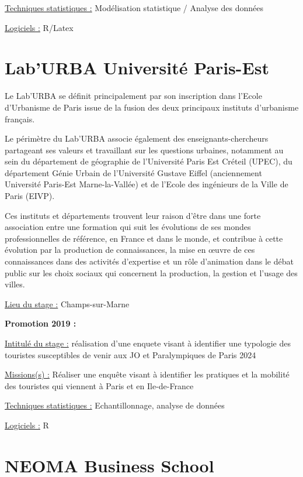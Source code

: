 \documentclass[
  letterpaper,
  DIV=11,
  numbers=noendperiod]{scrreprt}
\begin{document}
\uline{Techniques statistiques :} Modélisation statistique / Analyse des
données

\uline{Logiciels :} R/Latex

\hypertarget{laburba-universituxe9-paris-est}{%
\section{\texorpdfstring{\textbf{Lab'URBA Université
Paris-Est}}{Lab'URBA Université Paris-Est}}\label{laburba-universituxe9-paris-est}}

Le Lab'URBA se définit principalement par son inscription dans l'Ecole
d'Urbanisme de Paris issue de la fusion des deux principaux instituts
d'urbanisme français.

Le périmètre du Lab'URBA associe également des enseignants-chercheurs
partageant ses valeurs et travaillant sur les questions urbaines,
notamment au sein du département de géographie de l'Université Paris Est
Créteil (UPEC), du département Génie Urbain de l'Université Gustave
Eiffel (anciennement Université Paris-Est Marne-la-Vallée) et de l'Ecole
des ingénieurs de la Ville de Paris (EIVP).

Ces instituts et départements trouvent leur raison d'être dans une forte
association entre une formation qui suit les évolutions de ses mondes
professionnelles de référence, en France et dans le monde, et contribue
à cette évolution par la production de connaissances, la mise en œuvre
de ces connaissances dans des activités d'expertise et un rôle
d'animation dans le débat public sur les choix sociaux qui concernent la
production, la gestion et l'usage des villes.

\uline{Lieu du stage :} Champs-sur-Marne

\textbf{Promotion 2019 :}

\uline{Intitulé du stage :} réalisation d'une enquete visant à
identifier une typologie des touristes susceptibles de venir aux JO et
Paralympiques de Paris 2024

\uline{Missions(s) :} Réaliser une enquête visant à identifier les
pratiques et la mobilité des touristes qui viennent à Paris et en
Ile-de-France

\uline{Techniques statistiques :} Echantillonnage, analyse de données

\uline{Logiciels :} R

\hypertarget{neoma-business-school}{%
\section{\texorpdfstring{\textbf{NEOMA Business
School}}{NEOMA Business School}}\label{neoma-business-school}}
\end{document}
